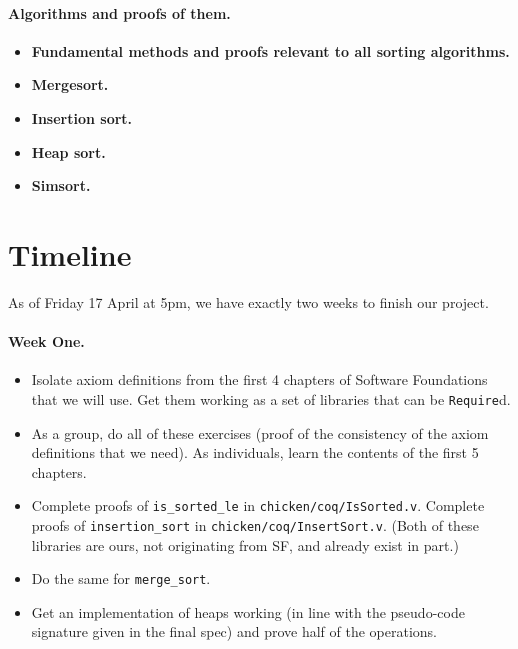 \documentclass{article}
\begin{document}
\paragraph{Algorithms and proofs of them.}
\begin{itemize}
  \item \textbf{Fundamental methods and proofs relevant to all
                sorting algorithms.}
  \item \textbf{Mergesort.}
  \item \textbf{Insertion sort.}
  \item \textbf{Heap sort.}
  \item \textbf{Simsort.}
\end{itemize}


\section{Timeline}
As of Friday 17 April at 5pm, we have exactly two weeks to finish our project.

\paragraph{Week One.}
\begin{itemize}
  \item
Isolate axiom definitions from the first 4 chapters of Software Foundations that we will use. Get them working as a set of      libraries that can be \verb`Require`d.
\item  As a group, do all of these exercises (proof of the consistency of the axiom definitions that we need). As individuals, learn   the contents of the first 5 chapters.
\item  Complete proofs of \verb`is_sorted_le` in \verb`chicken/coq/IsSorted.v`. Complete proofs of \verb`insertion_sort` in 
  \verb`chicken/coq/InsertSort.v`. (Both of these libraries are ours, not originating from SF, and already exist in part.)
\item  Do the same for \verb`merge_sort`.
\item Get an implementation of heaps working (in line with the pseudo-code signature given in the final spec) and prove half of the   operations.
\end{itemize}
\end{document}
